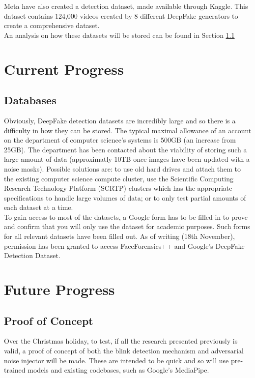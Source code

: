 \documentclass{article}
\begin{document}
Meta have also created a detection dataset\cite{DFDC2020}, made available through Kaggle\cite{kagglemeta}. This dataset contains 124,000 videos created by 8 different DeepFake generators to create a comprehensive dataset.\\

An analysis on how these datasets will be stored can be found in Section \ref{sec:databases}

\section{Current Progress}

\subsection{Databases} \label{sec:databases}

Obviously, DeepFake detection datasets are incredibly large and so there is a difficulty in how they can be stored. The typical maximal allowance of an account on the department of computer science's systems is 500GB (an increase from 25GB)\cite{dcsquota}. The department has been contacted about the viability of storing such a large amount of data (approximatly 10TB once images have been updated with a noise masks). Possible solutions are: to use old hard drives and attach them to the existing computer science compute cluster, use the  Scientific Computing Research Technology Platform (SCRTP) clusters which has the appropriate specifications to handle large volumes of data; or to only test partial amounts of each dataset at a time.\\

To gain access to most of the datasets, a Google form has to be filled in to prove and confirm that you will only use the dataset for academic purposes. Such forms for all relevant datasets have been filled out. As of writing (18th November), permission has been granted to access FaceForensics++ and Google's DeepFake Detection Dataset.

\section{Future Progress}
\subsection{Proof of Concept}

Over the Christmas holiday, to test, if all the research presented previously is valid, a proof of concept of both the blink detection mechanism and adversarial noise injector will be made. These are intended to be quick and so will use pre-trained models and existing codebases, such as Google's MediaPipe. 
\end{document}
